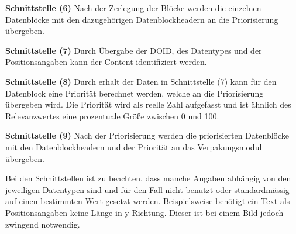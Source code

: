 \textbf{Schnittstelle (6)} \newline
Nach der Zerlegung der Blöcke werden die einzelnen
Datenblöcke mit den dazugehörigen Datenblockheadern an die
Priorisierung übergeben.

\textbf{Schnittstelle (7)} \newline
Durch Übergabe der DOID, des Datentypes und der Positionsangaben kann der
Content identifiziert werden.

\textbf{Schnittstelle (8)} \newline
Durch erhalt der Daten in Schnittstelle (7) kann für
den Datenblock eine Priorität berechnet werden, welche an die Priorisierung übergeben
wird. Die Priorität wird als reelle Zahl aufgefasst und ist ähnlich des
Relevanzwertes eine prozentuale Größe zwischen 0 und 100.

\textbf{Schnittstelle (9)} \newline
Nach der Priorisierung werden die priorisierten Datenblöcke mit den
Datenblockheadern und der Priorität an das Verpakungsmodul übergeben.

Bei den Schnittstellen ist zu beachten, dass manche Angaben abhängig von den
jeweiligen Datentypen sind und für den Fall nicht benutzt oder
standardmässig auf einen bestimmten Wert gesetzt werden. Beispielsweise benötigt
ein Text als Positionsangaben keine Länge in y-Richtung. Dieser ist bei einem
Bild jedoch zwingend notwendig.
